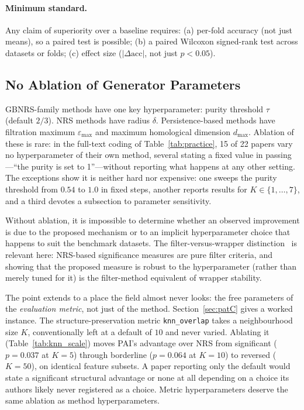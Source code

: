 \paragraph{Minimum standard.}
Any claim of superiority over a baseline requires:
(a) per-fold accuracy (not just means), so a paired test is possible;
(b) a paired Wilcoxon signed-rank test across datasets or folds;
(c) effect size ($|\Delta \text{acc}|$, not just $p < 0.05$).

\subsection{No Ablation of Generator Parameters}
\label{sec:ablation}

GBNRS-family methods have one key hyperparameter: purity threshold $\tau$
(default $2/3$).  NRS methods have radius $\delta$.  Persistence-based
methods have filtration maximum $\varepsilon_{\max}$ and maximum homological
dimension $d_{\max}$.  Ablation of these is rare: in the full-text coding of
Table~\ref{tab:practice}, 15 of 22 papers vary no hyperparameter of their own
method, several stating a fixed value in passing---``the purity is set to
1''---without reporting what happens at any other setting.  The exceptions
show it is neither hard nor expensive: one sweeps the purity threshold from
$0.54$ to $1.0$ in fixed steps, another reports results for
$K \in \{1,\ldots,7\}$, and a third devotes a subsection to parameter
sensitivity.

Without ablation, it is impossible to determine whether an observed
improvement is due to the proposed mechanism or to an implicit
hyperparameter choice that happens to suit the benchmark datasets.
The filter-versus-wrapper distinction~\cite{KohaviJohn1997} is relevant here:
NRS-based significance measures are pure filter criteria, and showing that the
proposed measure is robust to the hyperparameter (rather than merely tuned for it)
is the filter-method equivalent of wrapper stability.

The point extends to a place the field almost never looks: the free
parameters of the \emph{evaluation metric}, not just of the method.
Section~\ref{sec:patC} gives a worked instance.  The structure-preservation
metric \texttt{knn\_overlap} takes a neighbourhood size $K$, conventionally
left at a default of $10$ and never varied.  Ablating it
(Table~\ref{tab:knn_scale}) moves PAI's advantage over NRS from significant
($p=0.037$ at $K=5$) through borderline ($p=0.064$ at $K=10$) to reversed
($K=50$), on identical feature subsets.  A paper reporting only the default
would state a significant structural advantage or none at all depending on a
choice its authors likely never registered as a choice.  Metric
hyperparameters deserve the same ablation as method hyperparameters.

